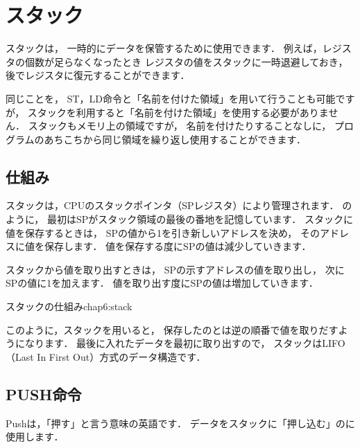 \newpage
\section{スタック}

スタックは，
一時的にデータを保管するために使用できます．
例えば，レジスタの個数が足らなくなったとき
レジスタの値をスタックに一時退避しておき，
後でレジスタに復元することができます．

同じことを，
ST，LD命令と「名前を付けた領域」を用いて行うことも可能ですが，
スタックを利用すると「名前を付けた領域」を使用する必要がありません．
スタックもメモリ上の領域ですが，
名前を付けたりすることなしに，
プログラムのあちこちから同じ領域を繰り返し使用することができます．


\subsection{仕組み}

スタックは，CPUのスタックポインタ（SPレジスタ）により管理されます．
のように，
最初はSPがスタック領域の最後の番地を記憶しています．
スタックに値を保存するときは，
SPの値から1を引き新しいアドレスを決め，
そのアドレスに値を保存します．
値を保存する度にSPの値は減少していきます．

スタックから値を取り出すときは，
SPの示すアドレスの値を取り出し，
次にSPの値に1を加えます．
値を取り出す度にSPの値は増加していきます．

{スタックの仕組み}{chap6:stack}

このように，スタックを用いると，
保存したのとは逆の順番で値を取りだすようになります．
最後に入れたデータを最初に取り出すので，
スタックはLIFO（Last In First Out）方式のデータ構造です．

\subsection{PUSH命令}

Pushは，「押す」と言う意味の英語です．
データをスタックに「押し込む」のに使用します．

